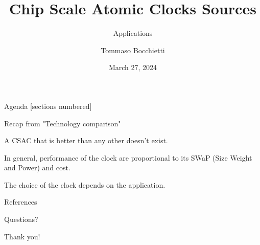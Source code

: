 \documentclass[10pt]{beamer}
\title{Chip Scale Atomic Clocks Sources}
\subtitle{Applications}
\date{March 27, 2024}
\author{Tommaso Bocchietti}
\institute{University of Waterloo}
\begin{document}
\maketitle

\begin{frame}{Agenda}
    [sections numbered]
    \tableofcontents[hideallsubsections]
\end{frame}

\begin{frame}{Recap from "Technology comparison"}

    A CSAC that is better than any other doesn't exist.

    \vspace{10pt}

    In general, performance of the clock are proportional to its SWaP (Size Weight and Power) and cost.

    \vspace{10pt}

    The choice of the clock depends on the application.

\end{frame}






\appendix



\begin{frame}[allowframebreaks]{References}
    \nocite{*}
    
\end{frame}

\begin{frame}[standout]
    Questions?
\end{frame}

\begin{frame}[standout]
    Thank you!
\end{frame}
\end{document}
